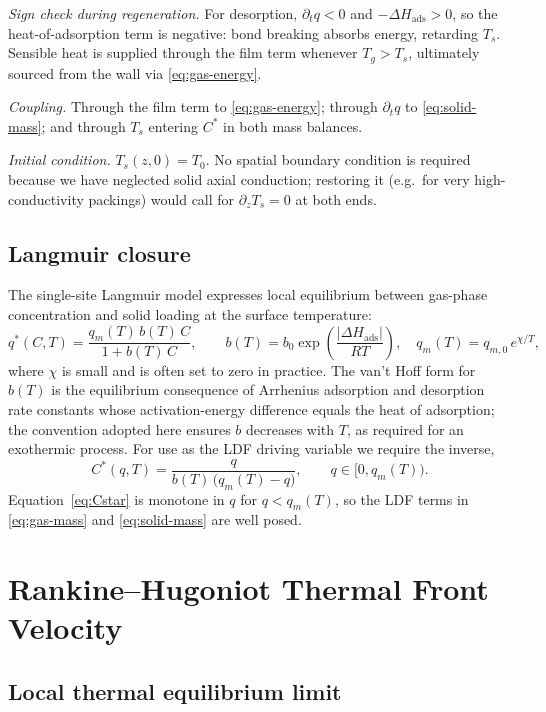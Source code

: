 \documentclass[a4paper,11pt]{amsart}
\theoremstyle{definition}
\begin{document}
\emph{Sign check during regeneration.} For desorption, $\partial_t q<0$ and $-\Delta H_{\text{ads}}>0$, so the heat-of-adsorption term is negative: bond breaking absorbs energy, retarding $T_s$. Sensible heat is supplied through the film term whenever $T_g>T_s$, ultimately sourced from the wall via \eqref{eq:gas-energy}.

\emph{Coupling.} Through the film term to \eqref{eq:gas-energy}; through $\partial_t q$ to \eqref{eq:solid-mass}; and through $T_s$ entering $C^\ast$ in both mass balances.

\emph{Initial condition.} $T_s(z,0)=T_0$. No spatial boundary condition is required because we have neglected solid axial conduction; restoring it (e.g.\ for very high-conductivity packings) would call for $\partial_z T_s=0$ at both ends.

\subsection{Langmuir closure}

The single-site Langmuir model expresses local equilibrium between gas-phase concentration and solid loading at the surface temperature:
\begin{equation}\label{eq:lang}
q^\ast(C,T) = \frac{q_m(T)\,b(T)\,C}{1+b(T)\,C},
\qquad
b(T)=b_0\exp\!\left(\frac{|\Delta H_{\text{ads}}|}{RT}\right),\quad
q_m(T)=q_{m,0}\,e^{\chi/T},
\end{equation}
where $\chi$ is small and is often set to zero in practice. The van't Hoff form for $b(T)$ is the equilibrium consequence of Arrhenius adsorption and desorption rate constants whose activation-energy difference equals the heat of adsorption; the convention adopted here ensures $b$ decreases with $T$, as required for an exothermic process. For use as the LDF driving variable we require the inverse,
\begin{equation}\label{eq:Cstar}
C^\ast(q,T) = \frac{q}{b(T)\,\bigl(q_m(T)-q\bigr)},
\qquad q\in[0,q_m(T)).
\end{equation}
Equation~\eqref{eq:Cstar} is monotone in $q$ for $q<q_m(T)$, so the LDF terms in \eqref{eq:gas-mass} and \eqref{eq:solid-mass} are well posed.

\section{Rankine--Hugoniot Thermal Front Velocity}\label{sec:RH}

\subsection{Local thermal equilibrium limit}
\end{document}
